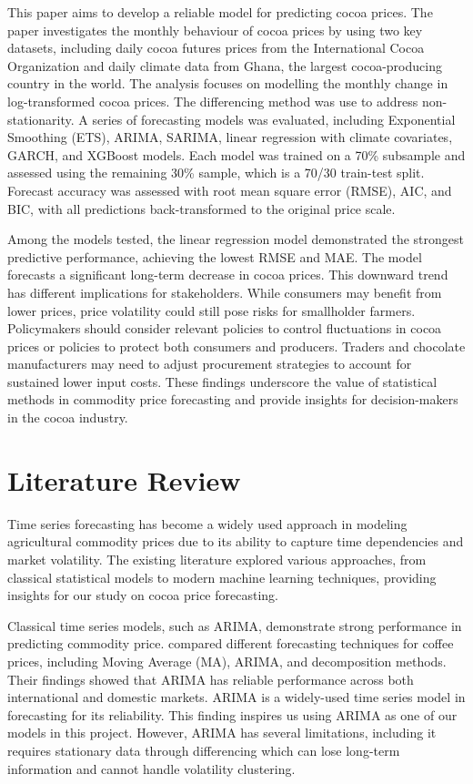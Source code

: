 \documentclass[10pt]{article}
\begin{document}
\noindent
This paper aims to develop a reliable model for predicting cocoa prices. The paper investigates the monthly behaviour of cocoa prices by using two key datasets, including daily cocoa futures prices from the International Cocoa Organization and daily climate data from Ghana, the largest cocoa-producing country in the world. The analysis focuses on modelling the monthly change in log-transformed cocoa prices. The differencing method was use to address non-stationarity. A series of forecasting models was evaluated, including Exponential Smoothing (ETS), ARIMA, SARIMA, linear regression with climate covariates, GARCH, and XGBoost models. Each model was trained on a 70\% subsample and assessed using the remaining 30\% sample, which is a 70/30 train-test split. Forecast accuracy was assessed with root mean square error (RMSE), AIC, and BIC, with all predictions back-transformed to the original price scale.

\noindent
Among the models tested, the linear regression model demonstrated the strongest predictive performance, achieving the lowest RMSE and MAE. The model forecasts a significant long-term decrease in cocoa prices. This downward trend has different implications for stakeholders. While consumers may benefit from lower prices, price volatility could still pose risks for smallholder farmers. Policymakers should consider relevant policies to control fluctuations in cocoa prices or policies to protect both consumers and producers. Traders and chocolate manufacturers may need to adjust procurement strategies to account for sustained lower input costs. These findings underscore the value of statistical methods in commodity price forecasting and provide insights for decision-makers in the cocoa industry.

\newpage

\section{Literature Review}
Time series forecasting has become a widely used approach in modeling agricultural commodity prices due to its ability to capture time dependencies and market volatility. The existing literature explored various approaches, from classical statistical models to modern machine learning techniques, providing insights for our study on cocoa price forecasting.

\noindent
Classical time series models, such as ARIMA, demonstrate strong performance in predicting commodity price. \cite{bestmodelcoffee} compared different forecasting techniques for coffee prices, including Moving Average (MA), ARIMA, and decomposition methods. Their findings showed that ARIMA has reliable performance across both international and domestic markets. ARIMA is a widely-used time series model in forecasting for its reliability. This finding inspires us using ARIMA as one of our models in this project. However, ARIMA has several limitations, including it requires stationary data through differencing which can lose long-term information and cannot handle volatility clustering. 
\end{document}
